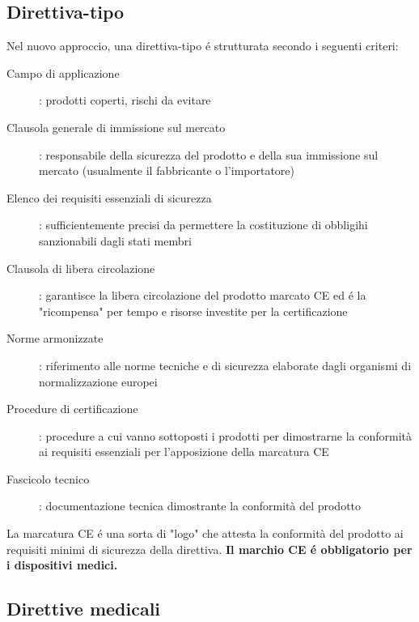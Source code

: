 \documentclass[a4paper]{article}
\begin{document}
\subsection{Direttiva-tipo}
Nel nuovo approccio, una direttiva-tipo é strutturata secondo i seguenti criteri:
\begin{description}
    \item[Campo di applicazione]: prodotti coperti, rischi da evitare
    \item[Clausola generale di immissione sul mercato]: responsabile della sicurezza del 
    prodotto e della sua immissione sul mercato (usualmente il fabbricante o l'importatore)
    \item[Elenco dei requisiti essenziali di sicurezza]: sufficientemente precisi da 
    permettere la costituzione di obbligihi sanzionabili dagli stati membri
    \item[Clausola di libera circolazione]: garantisce la libera circolazione del prodotto
    marcato CE ed é la "ricompensa" per tempo e risorse investite per la certificazione
    \item[Norme armonizzate]: riferimento alle norme tecniche e di sicurezza elaborate 
    dagli organismi di normalizzazione europei
    \item[Procedure di certificazione]: procedure a cui vanno sottoposti i prodotti per 
    dimostrarne la conformità ai requisiti essenziali per l'apposizione della marcatura 
    CE
    \item[Fascicolo tecnico]: documentazione tecnica dimostrante la conformità del prodotto    
\end{description}
La marcatura CE é una sorta di "logo" che attesta la conformità del prodotto ai requisiti 
minimi di sicurezza della direttiva.\newline
\textbf{Il marchio CE é obbligatorio per i dispositivi medici.}
\subsection{Direttive medicali}
\end{document}
